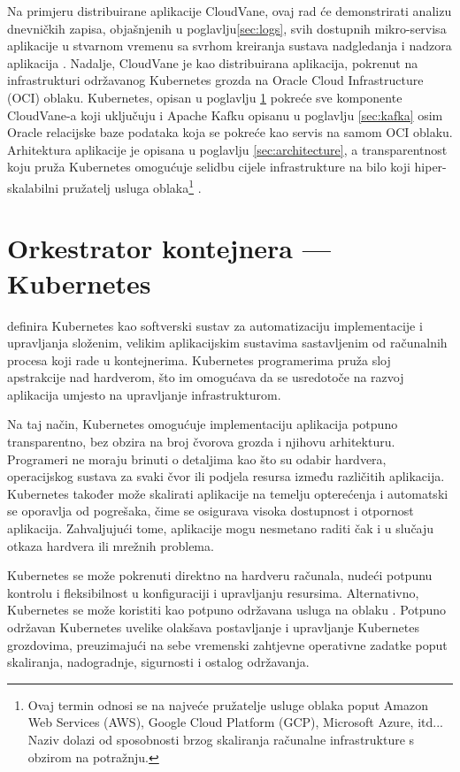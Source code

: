 \documentclass[times, utf8, diplomski]{fer}
\begin{document}
Na primjeru distribuirane aplikacije CloudVane, ovaj rad će demonstrirati analizu dnevničkih zapisa, objašnjenih u poglavlju\ref{sec:logs}, svih dostupnih mikro-servisa aplikacije u stvarnom vremenu  sa svrhom kreiranja sustava nadgledanja i nadzora aplikacija . Nadalje, CloudVane je kao distribuirana aplikacija, pokrenut na infrastrukturi održavanog Kubernetes grozda  na Oracle Cloud Infrastructure (OCI) oblaku. Kubernetes, opisan u poglavlju \ref{sec:k8s} pokreće sve komponente CloudVane-a koji uključuju i Apache Kafku opisanu u poglavlju \ref{sec:kafka} osim Oracle relacijske baze podataka koja se pokreće kao servis na samom OCI oblaku. Arhitektura aplikacije je opisana u poglavlju \ref{sec:architecture}, a transparentnost koju pruža Kubernetes omogućuje selidbu cijele infrastrukture na bilo koji hiper-skalabilni pružatelj usluga oblaka\footnote{Ovaj termin odnosi se na najveće pružatelje usluge oblaka poput Amazon Web Services (AWS), Google Cloud Platform (GCP), Microsoft Azure, itd... Naziv dolazi od sposobnosti brzog skaliranja računalne infrastrukture s obzirom na potražnju.} .

\section{Orkestrator kontejnera --- Kubernetes}
\label{sec:k8s}

\citet{luksa_kubernetes_2023} definira Kubernetes kao softverski sustav za automatizaciju implementacije  i upravljanja složenim, velikim aplikacijskim sustavima sastavljenim od računalnih procesa koji rade u kontejnerima.
Kubernetes programerima pruža sloj apstrakcije nad hardverom, što im omogućava da se usredotoče na razvoj aplikacija umjesto na upravljanje infrastrukturom.

Na taj način, Kubernetes omogućuje implementaciju aplikacija potpuno transparentno, bez obzira na broj čvorova grozda i njihovu arhitekturu. Programeri ne moraju brinuti o detaljima kao što su odabir hardvera, operacijskog sustava za svaki čvor ili podjela resursa između različitih aplikacija. Kubernetes također može skalirati aplikacije na temelju opterećenja i automatski se oporavlja od pogrešaka, čime se osigurava visoka dostupnost i otpornost aplikacija. Zahvaljujući tome, aplikacije mogu nesmetano raditi čak i u slučaju otkaza hardvera ili mrežnih problema.

Kubernetes se može pokrenuti direktno na hardveru računala, nudeći potpunu kontrolu i fleksibilnost u konfiguraciji i upravljanju resursima. Alternativno, Kubernetes se može koristiti kao potpuno održavana usluga  na oblaku . Potpuno održavan Kubernetes uvelike olakšava postavljanje i upravljanje Kubernetes grozdovima, preuzimajući na sebe vremenski zahtjevne operativne zadatke poput skaliranja, nadogradnje, sigurnosti i ostalog održavanja.
\end{document}
